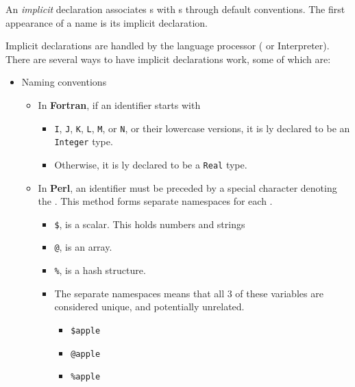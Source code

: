 \begin{definition}[Implicit]\label{def:Implicit_Static_Variable_Type_Binding}
  An \emph{implicit} declaration associates s with s through default conventions.
  The first appearance of a  name is its implicit declaration.
\end{definition}

Implicit declarations are handled by the language processor ( or Interpreter).
There are several ways to have implicit declarations work, some of which are:
\begin{itemize}[noitemsep]
\item Naming conventions
  \begin{itemize}[noitemsep]
  \item In \textbf{Fortran}, if an identifier starts with
    \begin{itemize}[noitemsep]
    \item \texttt{I}, \texttt{J}, \texttt{K}, \texttt{L}, \texttt{M}, or \texttt{N}, or their lowercase versions, it is ly declared to be an \texttt{Integer} type.
    \item Otherwise, it is ly declared to be a \texttt{Real} type.
    \end{itemize}
  \item In \textbf{Perl}, an identifier must be preceded by a special character denoting the . This method forms separate namespaces for each  .
    \begin{itemize}[noitemsep]
    \item \texttt{\$}, is a scalar. This holds numbers and strings
    \item \texttt{@}, is an array.
    \item \texttt{\%}, is a hash structure.
    \item The separate namespaces means that all 3 of these variables are considered unique, and potentially unrelated.
      \begin{itemize}[noitemsep]
      \item \texttt{\$apple}
      \item \texttt{@apple}
      \item \texttt{\%apple}
      \end{itemize}
    \end{itemize}
  \end{itemize}
  

\end{itemize}
